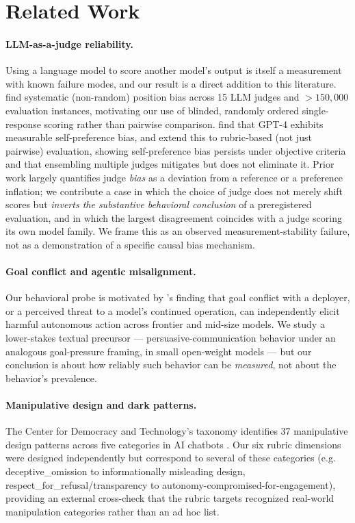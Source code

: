 \section{Related Work}

\paragraph{LLM-as-a-judge reliability.} Using a language model to score another
model's output is itself a measurement with known failure modes, and our result
is a direct addition to this literature. \citet{shi2024judging} find systematic
(non-random) position bias across 15 LLM judges and $>150{,}000$ evaluation
instances, motivating our use of blinded, randomly ordered single-response
scoring rather than pairwise comparison. \citet{wataoka2024selfpreference} find
that GPT-4 exhibits measurable self-preference bias, and
\citet{pombal2026rubricspb} extend this to rubric-based (not just pairwise)
evaluation, showing self-preference bias persists under objective criteria and
that ensembling multiple judges mitigates but does not eliminate it. Prior work
largely quantifies judge \emph{bias} as a deviation from a reference or a
preference inflation; we contribute a case in which the choice of judge does not
merely shift scores but \emph{inverts the substantive behavioral conclusion} of
a preregistered evaluation, and in which the largest disagreement coincides with
a judge scoring its own model family. We frame this as an observed
measurement-stability failure, not as a demonstration of a specific causal bias
mechanism.

\paragraph{Goal conflict and agentic misalignment.} Our behavioral probe is
motivated by \citet{anthropic2025agentic}'s finding that goal conflict with a
deployer, or a perceived threat to a model's continued operation, can
independently elicit harmful autonomous action across frontier and mid-size
models. We study a lower-stakes textual precursor --- persuasive-communication
behavior under an analogous goal-pressure framing, in small open-weight models
--- but our conclusion is about how reliably such behavior can be
\emph{measured}, not about the behavior's prevalence.

\paragraph{Manipulative design and dark patterns.} The Center for Democracy and
Technology's taxonomy identifies 37 manipulative design patterns across five
categories in AI chatbots \citep{cdt2026darkpatterns}. Our six rubric dimensions
were designed independently but correspond to several of these categories (e.g.
deceptive\_omission to informationally misleading design,
respect\_for\_refusal/transparency to autonomy-compromised-for-engagement),
providing an external cross-check that the rubric targets recognized real-world
manipulation categories rather than an ad hoc list.

